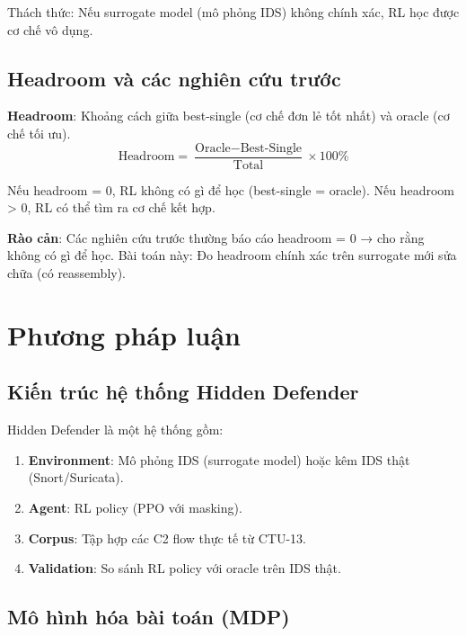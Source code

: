 \documentclass[12pt, a4paper, openany]{book}
\begin{document}
Thách thức: Nếu surrogate model (mô phỏng IDS) không chính xác, RL học được cơ chế vô dụng.

\section{Headroom và các nghiên cứu trước}

\textbf{Headroom}: Khoảng cách giữa best-single (cơ chế đơn lẻ tốt nhất) và oracle (cơ chế tối ưu). 
$$\text{Headroom} = \frac{\text{Oracle} - \text{Best-Single}}{\text{Total}} \times 100\%$$

Nếu headroom = 0, RL không có gì để học (best-single = oracle). Nếu headroom > 0, RL có thể tìm ra cơ chế kết hợp.

\textbf{Rào cản}: Các nghiên cứu trước thường báo cáo headroom = 0 → cho rằng không có gì để học. Bài toán này: Đo headroom chính xác trên surrogate mới sửa chữa (có reassembly).

\chapter{Phương pháp luận}

\section{Kiến trúc hệ thống Hidden Defender}

Hidden Defender là một hệ thống gồm:
\begin{enumerate}
    \item \textbf{Environment}: Mô phỏng IDS (surrogate model) hoặc kêm IDS thật (Snort/Suricata).
    \item \textbf{Agent}: RL policy (PPO với masking).
    \item \textbf{Corpus}: Tập hợp các C2 flow thực tế từ CTU-13.
    \item \textbf{Validation}: So sánh RL policy với oracle trên IDS thật.
\end{enumerate}

\section{Mô hình hóa bài toán (MDP)}
\end{document}
